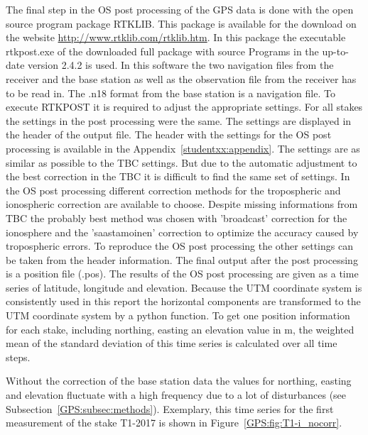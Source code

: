 The final step in the OS post processing of the GPS data is done with the open source program package RTKLIB.
This package is available for the download on the website \url{http://www.rtklib.com/rtklib.htm}.
In this package the executable rtkpost.exe of the downloaded full package with source Programs in the up-to-date version 2.4.2 is used.
In this software the two navigation files from the receiver and the base station as well as the observation file from the receiver has to be read in.
The .n18 format from the base station is a navigation file.
To execute RTKPOST it is required to adjust the appropriate settings.
For all stakes the settings in the post processing were the same.
The settings are displayed in the header of the output file.
The header with the settings for the OS post processing is available in the Appendix~\ref{studentxx:appendix}.
The settings are as similar as possible to the TBC settings.
But due to the automatic adjustment to the best correction in the TBC it is difficult to find the same set of settings.
In the OS post processing different correction methods for the tropospheric and ionospheric correction are available to choose. 
Despite missing informations from TBC the probably best method was chosen with 'broadcast' correction for the ionosphere and the 'saastamoinen' correction to optimize the accuracy caused by tropospheric errors. 
To reproduce the OS post processing the other settings can be taken from the header information. 
The final output after the post processing is a position file (.pos). 
The results of the OS post processing are given as a time series of latitude, longitude and elevation.
Because the UTM coordinate system is consistently used in this report the horizontal components are transformed to the UTM coordinate system by a python function.
To get one position information for each stake, including northing, easting an elevation value in m, the weighted mean of the standard deviation of this time series is calculated over all time steps.

Without the correction of the base station data the values for northing, easting and elevation fluctuate with a high frequency due to a lot of disturbances (see Subsection~\ref{GPS:subsec:methods}). 
Exemplary, this time series for the first measurement of the stake T1-2017 is shown in Figure~\ref{GPS:fig:T1-i_nocorr}.

